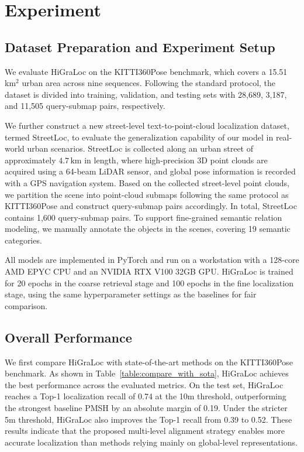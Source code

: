 \documentclass{article}
\begin{document}
\section{Experiment}
\subsection{Dataset Preparation and Experiment Setup}
We evaluate HiGraLoc on the KITTI360Pose benchmark, which covers a 15.51 km$^2$ urban area across nine sequences. Following the standard protocol, the dataset is divided into training, validation, and testing sets with 28,689, 3,187, and 11,505 query-submap pairs, respectively. 

We further construct a new street-level text-to-point-cloud localization dataset, termed StreetLoc, 
to evaluate the generalization capability of our model in real-world urban scenarios. StreetLoc is collected along an urban street of approximately $4.7\,\mathrm{km}$ in length, 
where high-precision 3D point clouds are acquired using a 64-beam LiDAR sensor, and global pose information is recorded with a GPS navigation system. Based on the collected street-level 
point clouds, we partition the scene into point-cloud submaps following the same protocol as KITTI360Pose and construct query-submap pairs accordingly. In total, StreetLoc contains 1,600 
query-submap pairs. To support fine-grained semantic relation modeling, we manually annotate the objects in the scenes, covering 19 semantic categories. 

All models are implemented in PyTorch and run on a workstation with a 128-core AMD EPYC CPU and an NVIDIA RTX V100 32GB GPU. HiGraLoc is trained for 20 epochs in the coarse retrieval stage and 100 epochs in the fine localization stage, using the same hyperparameter settings as the baselines for fair comparison.
\subsection{Overall Performance}
We first compare HiGraLoc with state-of-the-art methods on the KITTI360Pose benchmark. 
As shown in Table~\ref{table:compare_with_sota}, HiGraLoc achieves the best performance across the evaluated metrics. 
On the test set, HiGraLoc reaches a Top-1 localization recall of 0.74 at the 10m threshold, outperforming the strongest baseline PMSH by an absolute margin of 0.19. Under the stricter 5m threshold, HiGraLoc also improves the Top-1 recall from 0.39 to 0.52. These results indicate that the proposed multi-level alignment strategy enables more accurate localization than methods relying mainly on global-level representations.
\end{document}
